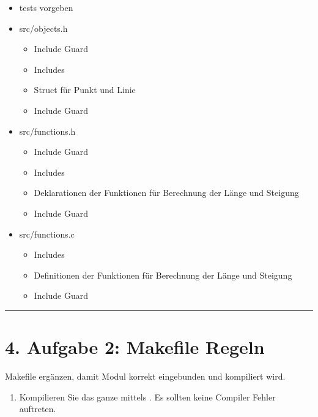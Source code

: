 \documentclass[a4paper,10pt,english]{report}
\begin{document}
\begin{itemize}
\item {} 
\sphinxAtStartPar
tests vorgeben

\item {} 
\sphinxAtStartPar
src/objects.h
\begin{itemize}
\item {} 
\sphinxAtStartPar
Include Guard

\item {} 
\sphinxAtStartPar
Includes

\item {} 
\sphinxAtStartPar
Struct für Punkt und Linie

\item {} 
\sphinxAtStartPar
Include Guard

\end{itemize}

\item {} 
\sphinxAtStartPar
src/functions.h
\begin{itemize}
\item {} 
\sphinxAtStartPar
Include Guard

\item {} 
\sphinxAtStartPar
Includes

\item {} 
\sphinxAtStartPar
Deklarationen der Funktionen für Berechnung der Länge und Steigung

\item {} 
\sphinxAtStartPar
Include Guard

\end{itemize}

\item {} 
\sphinxAtStartPar
src/functions.c
\begin{itemize}
\item {} 
\sphinxAtStartPar
Includes

\item {} 
\sphinxAtStartPar
Definitionen der Funktionen für Berechnung der Länge und Steigung

\item {} 
\sphinxAtStartPar
Include Guard

\end{itemize}

\end{itemize}


\bigskip\hrule\bigskip



\section{4. Aufgabe 2: Makefile Regeln}
\label{\detokenize{P04_Modularisieren_von_C_Code/new_P04/P04_Modularisieren_von_C_Code:aufgabe-2-makefile-regeln}}
\sphinxAtStartPar
Makefile ergänzen, damit Modul  korrekt eingebunden und kompiliert wird.
\begin{enumerate}
%
\item {} 
\sphinxAtStartPar
Kompilieren Sie das ganze mittels . Es sollten keine Compiler Fehler auftreten.

\end{enumerate}
\end{document}
